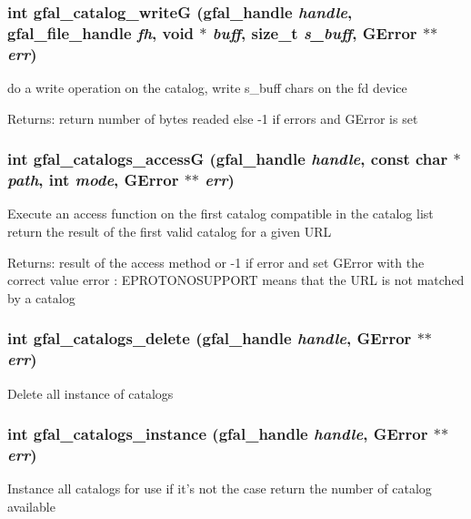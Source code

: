 \subsubsection{\setlength{\rightskip}{0pt plus 5cm}int gfal\_\-catalog\_\-write\-G (gfal\_\-handle {\em handle}, gfal\_\-file\_\-handle {\em fh}, void $\ast$ {\em buff}, size\_\-t {\em s\_\-buff}, GError $\ast$$\ast$ {\em err})}\label{gfal__common__catalog_8c_e9c3e214dbb01960295148aa66c42cb8}


do a write operation on the catalog, write s\_\-buff chars on the fd device \begin{Desc}
\item[Returns:]return number of bytes readed else -1 if errors and GError is set \end{Desc}
\subsubsection{\setlength{\rightskip}{0pt plus 5cm}int gfal\_\-catalogs\_\-access\-G (gfal\_\-handle {\em handle}, const char $\ast$ {\em path}, int {\em mode}, GError $\ast$$\ast$ {\em err})}\label{gfal__common__catalog_8c_4fd85b35f2134b73207c12b54e85959d}


Execute an access function on the first catalog compatible in the catalog list return the result of the first valid catalog for a given URL \begin{Desc}
\item[Returns:]result of the access method or -1 if error and set GError with the correct value error : EPROTONOSUPPORT means that the URL is not matched by a catalog \end{Desc}
\subsubsection{\setlength{\rightskip}{0pt plus 5cm}int gfal\_\-catalogs\_\-delete (gfal\_\-handle {\em handle}, GError $\ast$$\ast$ {\em err})}\label{gfal__common__catalog_8c_c0412247b6ddd6ceac7fb171c56adaad}


Delete all instance of catalogs 
\subsubsection{\setlength{\rightskip}{0pt plus 5cm}int gfal\_\-catalogs\_\-instance (gfal\_\-handle {\em handle}, GError $\ast$$\ast$ {\em err})\hspace{0.3cm}{\tt  [inline]}}\label{gfal__common__catalog_8c_96ebd098ad2447a81f096207879b9d3a}


Instance all catalogs for use if it's not the case return the number of catalog available 